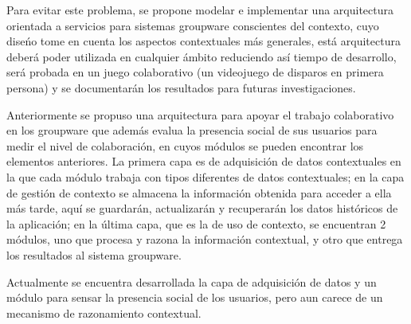 Para evitar este problema, se propone modelar e implementar una arquitectura orientada a servicios para sistemas groupware conscientes del contexto, cuyo dise\'no tome en cuenta los aspectos contextuales m\'as generales, est\'a arquitectura deber\'a poder utilizada en cualquier \'ambito reduciendo as\'i tiempo de desarrollo, ser\'a probada en un juego colaborativo (un videojuego de disparos en primera persona) y se documentar\'an los resultados para futuras investigaciones.
 
Anteriormente se propuso una arquitectura para apoyar el trabajo colaborativo en los groupware que adem\'as evalua la presencia social de sus usuarios para medir el nivel de colaboraci\'on, en cuyos m\'odulos se pueden encontrar los elementos anteriores. La primera capa es de adquisici\'on de datos contextuales en la que cada m\'odulo trabaja con tipos diferentes de datos contextuales; en la capa de gesti\'on de contexto se almacena la informaci\'on obtenida para acceder a ella m\'as tarde, aqu\'i se guardar\'an, actualizar\'an y recuperar\'an los datos hist\'oricos de la aplicaci\'on; en la \'ultima capa, que es la de uso de contexto, se encuentran 2 m\'odulos, uno que procesa y razona la informaci\'on contextual, y otro que entrega los resultados al sistema groupware.

Actualmente se encuentra desarrollada la capa de adquisici\'on de datos y un m\'odulo para sensar la presencia social de los usuarios, pero aun carece de un mecanismo de razonamiento contextual.
